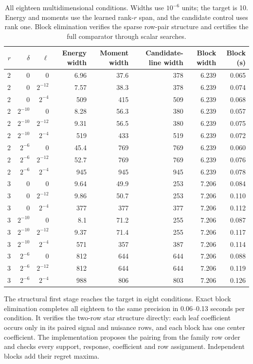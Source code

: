 \begin{table}[t]\centering\small\setlength{\tabcolsep}{5pt}
\caption{All eighteen multidimensional conditions. Widths use $10^{-6}$ units; the target is 10. Energy and moments use the learned rank-$r$ span, and the candidate control uses rank one. Block elimination verifies the sparse row-pair structure and certifies the full comparator through scalar searches.}\label{tab:multirank-v82}
\begin{tabular}{rrrrrrrr}\toprule $r$&$\delta$&$\ell$&Energy width&Moment width&Candidate-line width&Block width&Block (s)\\\midrule
2&0&0&6.96&37.6&378&6.239&0.065\\
2&0&$2^{-12}$&7.57&38.3&378&6.239&0.074\\
2&0&$2^{-4}$&509&415&509&6.239&0.068\\
2&$2^{-10}$&0&8.28&56.3&380&6.239&0.057\\
2&$2^{-10}$&$2^{-12}$&9.31&56.5&380&6.239&0.075\\
2&$2^{-10}$&$2^{-4}$&519&433&519&6.239&0.072\\
2&$2^{-6}$&0&45.4&769&769&6.239&0.060\\
2&$2^{-6}$&$2^{-12}$&52.7&769&769&6.239&0.076\\
2&$2^{-6}$&$2^{-4}$&945&945&945&6.239&0.078\\
3&0&0&9.64&49.9&253&7.206&0.084\\
3&0&$2^{-12}$&9.86&50.7&253&7.206&0.110\\
3&0&$2^{-4}$&377&377&377&7.206&0.112\\
3&$2^{-10}$&0&8.1&71.2&255&7.206&0.087\\
3&$2^{-10}$&$2^{-12}$&9.37&71.4&255&7.206&0.117\\
3&$2^{-10}$&$2^{-4}$&571&357&387&7.206&0.114\\
3&$2^{-6}$&0&812&644&644&7.206&0.088\\
3&$2^{-6}$&$2^{-12}$&812&644&644&7.206&0.119\\
3&$2^{-6}$&$2^{-4}$&988&806&803&7.206&0.126\\
\bottomrule\end{tabular}\end{table}

The structural first stage reaches the target in eight conditions. Exact block elimination completes all eighteen to the same precision in 0.06--0.13 seconds per condition. It verifies the two-row star structure directly: each leaf coefficient occurs only in its paired signal and nuisance rows, and each block has one center coefficient. The implementation proposes the pairing from the family row order and checks every support, response, coefficient and row assignment. Independent blocks add their regret maxima.

